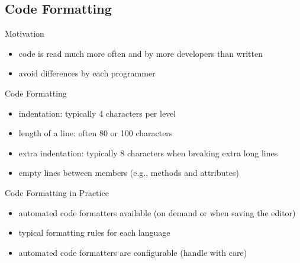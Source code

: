 \subsection{Code Formatting}
\begin{frame}{\insertsubsection}
	\begin{fancycolumns}
		\begin{note}{Motivation}
			\begin{itemize}
				\item code is read much more often and by more developers than written
				\item avoid differences by each programmer
			\end{itemize}
		\end{note} %
		\begin{definition}{Code Formatting}
			\begin{itemize}
				\item indentation: typically 4 characters per level
				\item length of a line: often 80 or 100 characters
				\item extra indentation: typically 8 characters when breaking extra long lines
				\item empty lines between members (e.g., methods and attributes)
			\end{itemize}
		\end{definition} %
	\nextcolumn
		\begin{example}{Code Formatting in Practice}
			\begin{itemize}
				\item automated code formatters available (on demand or when saving the editor)
				\item typical formatting rules for each language
				\item automated code formatters are configurable (handle with care)
			\end{itemize}
		\end{example} %
	\end{fancycolumns}
\end{frame}

